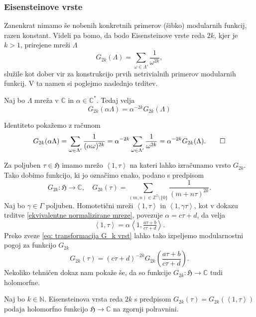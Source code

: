 \documentclass[mat1]{fmfdelo}
\numberwithin{equation}{section}
\newcommand{\N}{\mathbb N}
\newcommand{\Z}{\mathbb Z}
\newcommand{\C}{\mathbb C}
\newcommand{\HH}{\mathfrak{H}}
\newcommand{\CM}{\mathbb C ^*}
\newcommand{\om}{\omega}
\newcommand{\SL}{\Gamma}
\newcommand{\lattice}[2]{\left\langle #1, #2 \right\rangle}
\theoremstyle{definition}
\begin{document}
\subsubsection*{Eisensteinove vrste}
Zanenkrat nimamo še nobenih konkretnih primerov (šibko) modularnih funkcij, razen konstant. Videli pa bomo, da bodo Eisensteinove vrste reda $2k$, kjer je $k > 1$, prirejene mreži $\Lambda$
\[
    G_{2k}(\Lambda) = \sum_{\om\in\Lambda'}\frac{1}{\om^{2k}},
\]
služile kot dober vir za konstrukcijo prvih netrivialnih primerov modularnih funkcij. V ta namen si poglejmo naslednjo trditev.

\begin{trditev}
    Naj bo $\Lambda$ mreža v $\C$ in $\alpha \in \CM$. Tedaj velja
    \begin{equation}
    \label{eq: transformacija G_k vrst}
        G_{2k}(\alpha\Lambda) = \alpha^{-2k}G_{2k}(\Lambda)
    \end{equation}
\end{trditev}

\begin{dokaz}
    Identiteto pokažemo z računom
    \[
        G_{2k}(\alpha\Lambda) = \sum_{\om\in\Lambda'}\frac{1}{(\alpha\om)^{2k}} = \alpha^{-2k}\sum_{\om\in\Lambda'}\frac{1}{\om^{2k}} = \alpha^{-2k}G_{2k}(\Lambda). \qedhere
    \]
\end{dokaz}
Za poljuben $\tau \in \HH$ imamo mrežo $\lattice{1}{\tau}$ na kateri lahko izračunamo vrsto $G_{2k}$. Tako dobimo funkcijo, ki jo označimo enako, podano s predpisom
\[
    G_{2k} : \HH \to \C, \quad G_{2k}(\tau) = \sum_{(m,n) \in \Z^2\setminus\{0\}} \frac{1}{(m + n\tau)^{2k}}.
\]
Naj bo $\gamma \in \SL$ poljuben. Homotetični mreži $\lattice{1}{\tau}$ in $\lattice{1}{\gamma\tau}$, kot v dokazu trditve \ref{ekvivalentne normalizirane mreze}, povezuje $\alpha = c\tau + d$, da velja
\[
    \lattice{1}{\tau} = \alpha\lattice{1}{\tfrac{a\tau + b}{c\tau + d}}.
\]
Preko zveze \eqref{eq: transformacija G_k vrst} lahko tako izpeljemo modularnostni pogoj za funkcijo $G_{2k}$
\[
    G_{2k}(\tau) = (c\tau + d)^{-2k}G_{2k}\left(\frac{a\tau + b}{c\tau + d}\right).
\]
Nekoliko tehničen dokaz
nam pokaže še, da so funkcije $G_{2k} : \HH \to \C$ tudi holomorfne.

\begin{trditev}
    \label{holomorfnost Gk}
    Naj bo $k \in \N$. Eisensteinova vrsta reda $2k$ s predpisom $G_{2k}(\tau) = G_{2k}(\lattice{1}{\tau})$ podaja holomorfno funkcijo $\HH \to \C$ na zgornji polravnini.
\end{trditev}
\end{document}
